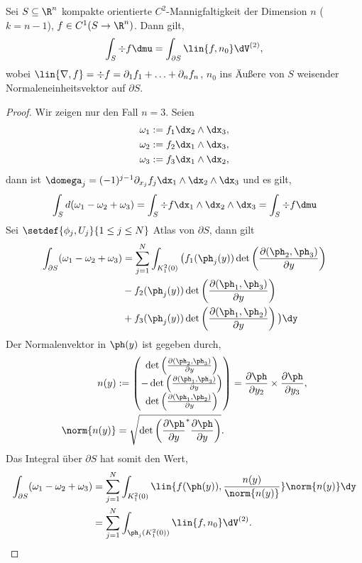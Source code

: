 \begin{prop}
\label{prop:4.57}
Sei $S\subseteq\R^n$ kompakte orientierte $C^2$-Mannigfaltigkeit der Dimension
$n$ ($k=n-1$), $f\in C^1(S\to\R^n)$. Dann gilt,
\begin{align*}
\int_S \div f \dmu = \int_{\partial S} \lin{f,n_0} \dV^{(2)},
\end{align*}
wobei $\lin{\nabla,f} = \div f = \partial_1 f_1 + \ldots + \partial_n f_n$,
$n_0$ ins Äußere von $S$ weisender Normaleneinheitsvektor auf $\partial S$.\fishhere
\end{prop}
\begin{proof}
Wir zeigen nur den Fall $n=3$. Seien
\begin{align*}
&\omega_1 := f_1 \dx_2\land\dx_3,\\
&\omega_2 := f_2 \dx_1\land\dx_3,\\
&\omega_3 := f_3 \dx_1\land\dx_2,
\end{align*}
dann ist $\domega_j = (-1)^{j-1} \partial_{x_j} f_j \dx_1\land \dx_2\land
\dx_3$ und es gilt,
\begin{align*}
\int_S d(\omega_1-\omega_2+\omega_3) = \int_S \div f \dx_1\land\dx_2\land\dx_3
= \int_S \div f \dmu
\end{align*}
Sei $\setdef{\phi_j,U_j}{1\le j\le N}$ Atlas von $\partial S$, dann gilt
\begin{align*}
\int_{\partial S} (\omega_1-\omega_2+\omega_3)
&= \sum\limits_{j=1}^N \int_{K_1^2(0)} \big(f_1(\ph_j(y))
\det\left(\frac{\partial(\ph_2,\ph_3)}{\partial y}\right)\\
&-f_2(\ph_j(y)) \det\left(\frac{\partial(\ph_1,\ph_3)}{\partial y}\right)\\
&+f_3(\ph_j(y)) \det\left(\frac{\partial(\ph_1,\ph_2)}{\partial y}\right)
\big) \dy
\end{align*}
Der Normalenvektor in $\ph(y)$ ist gegeben durch,
\begin{align*}
n(y) &:= \begin{pmatrix}
\det\left(\frac{\partial(\ph_2,\ph_3)}{\partial y}\right)\\
-\det\left(\frac{\partial(\ph_1,\ph_3)}{\partial y}\right)\\
\det\left(\frac{\partial(\ph_1,\ph_2)}{\partial y}\right)
\end{pmatrix}
= \frac{\partial\ph}{\partial y_2}\times \frac{\partial\ph}{\partial y_3},\\
\norm{n(y)} &= \sqrt{\det\left(\frac{\partial\ph}{\partial y}^*
\frac{\partial\ph}{\partial y}\right)}.
\end{align*}
Das Integral über $\partial S$ hat somit den Wert,
\begin{align*}
\int_{\partial S} (\omega_1-\omega_2+\omega_3) &= \sum\limits_{j=1}^N
\int_{K_1^{2}(0)} \lin{f(\ph(y)),\frac{n(y)}{\norm{n(y)}}} \norm{n(y)} \dy
\\ &=  \sum\limits_{j=1}^N \int_{\ph_j(K_1^{2}(0))}
\lin{f,n_0} \dV^{(2)}.\qedhere
\end{align*}
\end{proof}
